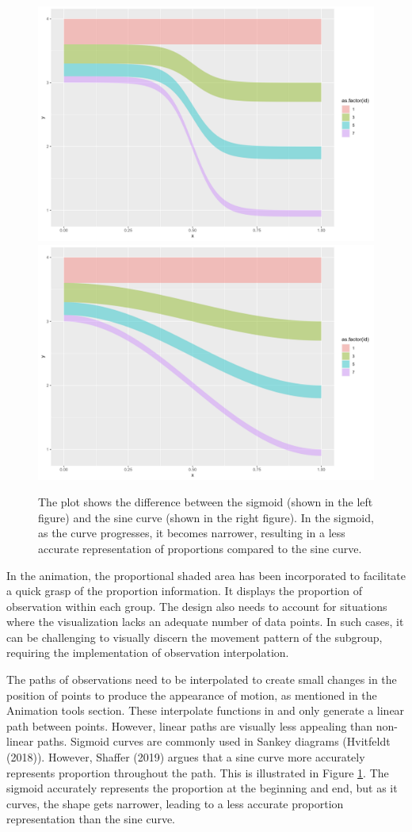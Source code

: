 \begin{figure}
\includegraphics[width=0.5\linewidth]{figures/sigmoid-shade} \includegraphics[width=0.5\linewidth]{figures/sine-shade} \caption{The plot shows the difference between the sigmoid (shown in the left figure) and the sine curve (shown in the right figure). In the sigmoid, as the curve progresses, it becomes narrower, resulting in a less accurate representation of proportions compared to the sine curve.}\label{fig:proportional-shade}
\end{figure}

In the animation, the proportional shaded area has been incorporated to facilitate a quick grasp of the proportion information. It displays the proportion of observation within each group. The design also needs to account for situations where the visualization lacks an adequate number of data points. In such cases, it can be challenging to visually discern the movement pattern of the subgroup, requiring the implementation of observation interpolation.

The paths of observations need to be interpolated to create small changes in the position of points to produce the appearance of motion, as mentioned in the Animation tools section. These interpolate functions in  and  only generate a linear path between points. However, linear paths are visually less appealing than non-linear paths. Sigmoid curves are commonly used in Sankey diagrams (Hvitfeldt (2018)). However, Shaffer (2019) argues that a sine curve more accurately represents proportion throughout the path. This is illustrated in Figure \ref{fig:proportional-shade}. The sigmoid accurately represents the proportion at the beginning and end, but as it curves, the shape gets narrower, leading to a less accurate proportion representation than the sine curve.

